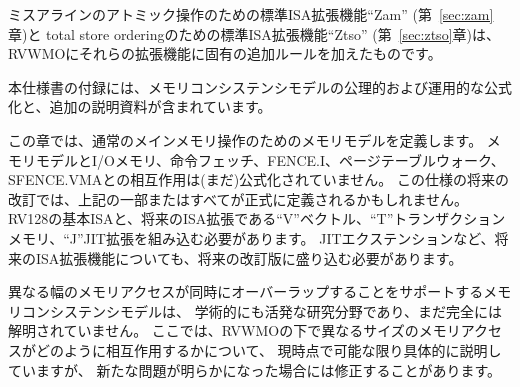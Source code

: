 \begin{comment}
The standard ISA extension for misaligned atomics ``Zam'' (Chapter~\ref{sec:zam}) and the standard ISA extension for total store ordering ``Ztso'' (Chapter~\ref{sec:ztso}) augment RVWMO with additional rules specific to those extensions.
\end{comment}

ミスアラインのアトミック操作のための標準ISA拡張機能``Zam'' (第~\ref{sec:zam}章)と
total store orderingのための標準ISA拡張機能``Ztso'' (第~\ref{sec:ztso}章)は、
RVWMOにそれらの拡張機能に固有の追加ルールを加えたものです。

\begin{comment}
The appendices to this specification provide both axiomatic and operational formalizations of the memory consistency model as well as additional explanatory material.
\end{comment}

本仕様書の付録には、メモリコンシステンシモデルの公理的および運用的な公式化と、追加の説明資料が含まれています。

\begin{commentary}
\begin{comment}
  This chapter defines the memory model for regular main memory operations.  The interaction of the memory model with I/O memory, instruction fetches, FENCE.I, page table walks, and SFENCE.VMA is not (yet) formalized.  Some or all of the above may be formalized in a future revision of this specification.  The RV128 base ISA and future ISA extensions such as the ``V'' vector, ``T'' transactional memory, and ``J'' JIT extensions will need to be incorporated into a future revision as well.
\end{comment}
  この章では、通常のメインメモリ操作のためのメモリモデルを定義します。
メモリモデルとI/Oメモリ、命令フェッチ、FENCE.I、ページテーブルウォーク、SFENCE.VMAとの相互作用は(まだ)公式化されていません。
この仕様の将来の改訂では、上記の一部またはすべてが正式に定義されるかもしれません。
RV128の基本ISAと、将来のISA拡張である``V''ベクトル、``T''トランザクションメモリ、``J''JIT拡張を組み込む必要があります。
JITエクステンションなど、将来のISA拡張機能についても、将来の改訂版に盛り込む必要があります。

\begin{comment}
  Memory consistency models supporting overlapping memory accesses of different widths simultaneously remain an active area of academic research and are not yet fully understood.  The specifics of how memory accesses of different sizes interact under RVWMO are specified to the best of our current abilities, but they are subject to revision should new issues be uncovered.
\end{comment}
  異なる幅のメモリアクセスが同時にオーバーラップすることをサポートするメモリコンシステンシモデルは、
学術的にも活発な研究分野であり、まだ完全には解明されていません。
ここでは、RVWMOの下で異なるサイズのメモリアクセスがどのように相互作用するかについて、
現時点で可能な限り具体的に説明していますが、
新たな問題が明らかになった場合には修正することがあります。
\end{commentary}

